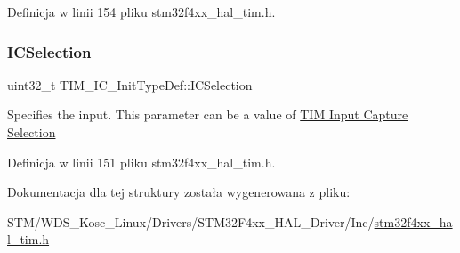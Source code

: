 Definicja w linii 154 pliku stm32f4xx\+\_\+hal\+\_\+tim.\+h.

\mbox{\label{struct_t_i_m___i_c___init_type_def_aad80556490de79727ba1269c851e9724}} 
\subsubsection{\texorpdfstring{I\+C\+Selection}{ICSelection}}
{\footnotesize\ttfamily uint32\+\_\+t T\+I\+M\+\_\+\+I\+C\+\_\+\+Init\+Type\+Def\+::\+I\+C\+Selection}

Specifies the input. This parameter can be a value of \hyperlink{group___t_i_m___input___capture___selection}{T\+IM Input Capture Selection} 

Definicja w linii 151 pliku stm32f4xx\+\_\+hal\+\_\+tim.\+h.



Dokumentacja dla tej struktury została wygenerowana z pliku\+:\begin{DoxyCompactItemize}
\item 
S\+T\+M/\+W\+D\+S\+\_\+\+Kosc\+\_\+\+Linux/\+Drivers/\+S\+T\+M32\+F4xx\+\_\+\+H\+A\+L\+\_\+\+Driver/\+Inc/\hyperlink{stm32f4xx__hal__tim_8h}{stm32f4xx\+\_\+hal\+\_\+tim.\+h}\end{DoxyCompactItemize}
